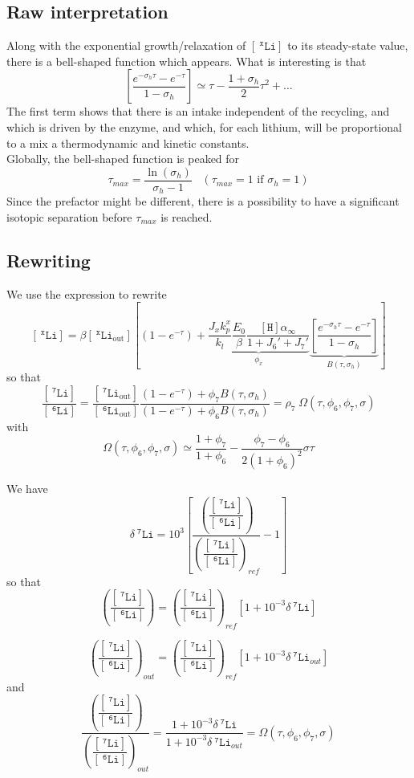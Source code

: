 \documentclass[aps,onecolumn,11pt]{revtex4}
\newcommand{\mychem}[1]{\mathtt{#1}}
\newcommand{\myconc}[1]{\left\lbrack{#1}\right\rbrack}
\newcommand{\spLi}[1]{{~^{\mychem{#1}}\mychem{Li}}}
\newcommand{\Li}[1]{\myconc{\spLi{#1}}}
\newcommand{\spLiOut}[1]{{\spLi{#1}}_{\mathrm{out}}}
\newcommand{\LiOut}[1]{\myconc{\spLiOut{#1}}}
\newcommand{\spproton}{\mychem{H}}
\newcommand{\proton}{\myconc{\spproton}}
\newcommand{\ratioLi}{ {\left(\dfrac{\Li{7}}{\Li{6}}\right)} }
\newcommand{\deltaLi}{ {\delta\!\!\spLi{7}} }
\begin{document}
\subsection{Raw interpretation}
Along with the exponential growth/relaxation of $\Li{x}$ to its steady-state value, there is a bell-shaped function which appears.
What is interesting is that
\begin{equation}
	\left[
	 \dfrac{e^{-\sigma_h\tau} - e^{-\tau} }{1 - \sigma_h}\right] 
	 \simeq \tau - \dfrac{1+\sigma_h}{2} \tau^2 + \ldots
\end{equation}
The first term shows that there is an intake independent of the recycling, and which is driven by the enzyme, and which, for each lithium, will be proportional to a mix a thermodynamic and kinetic constants.\\
Globally, the bell-shaped function is peaked for
\begin{equation}
	\tau_{max} = \dfrac{\ln(\sigma_h)}{\sigma_h-1}\;\;\;(\tau_{max}=1 \text{ if } \sigma_h=1)
\end{equation}
Since the prefactor might be different, there is a possibility to have a significant isotopic separation before $\tau_{max}$ is reached.

\subsection{Rewriting}
We use the expression to rewrite
\begin{equation}
	\Li{x} =  \beta\LiOut{x}\left\lbrack  \left(1-e^{ -\tau }\right) + 
	\underbrace{
	\dfrac{J_x k_p^x}{k_l}
	\dfrac{E_0}{\beta}
	\dfrac{\proton \alpha_\infty}{1+J_6'+J_7'}
	}_{\phi_x}
	\underbrace{
	\left[
	 \dfrac{e^{-\sigma_h\tau} - e^{-\tau} }{1 - \sigma_h}\right]
	 }_{B\left(\tau,\sigma_h\right)}
	 \right\rbrack
\end{equation}
so that
\begin{equation}
	\dfrac{\Li{7} }{\Li{6}} = \dfrac{\LiOut{7} }{\LiOut{6}} 
	\dfrac{\left(1-e^{ -\tau }\right) + \phi_7 B\left(\tau,\sigma_h\right)}{\left(1-e^{ -\tau }\right) + \phi_6 B\left(\tau,\sigma_h\right) } 
	= \rho_7 \; \Omega\left(\tau,\phi_6,\phi_7,\sigma\right)
\end{equation}
with
\begin{equation}
	\Omega\left(\tau,\phi_6,\phi_7,\sigma\right) \simeq
	\dfrac{1+\phi_7}{1+\phi_6}
	- \dfrac{\phi_7-\phi_6}{2\left(1+\phi_6\right)^2} \sigma \tau
\end{equation}	

We have
\begin{equation}
	\delta\spLi{7} = 10^{3}\left\lbrack \dfrac{\ratioLi}{\ratioLi_{ref}} - 1\right\rbrack
\end{equation}
so that
\begin{equation}
	\ratioLi = \ratioLi_{ref} \left[ 1 + 10^{-3}  \deltaLi \right]
\end{equation}

\begin{equation}
	\ratioLi_{out} = \ratioLi_{ref} \left[ 1 + 10^{-3}  \deltaLi_{out} \right]
\end{equation}
and
\begin{equation}
\boxed{
	\dfrac{\ratioLi}{\ratioLi_{out}} = \dfrac{1+10^{-3}\deltaLi}{1+10^{-3}\deltaLi_{out}} = \Omega\left(\tau,\phi_6,\phi_7,\sigma\right)
	}
\end{equation}
\end{document}
